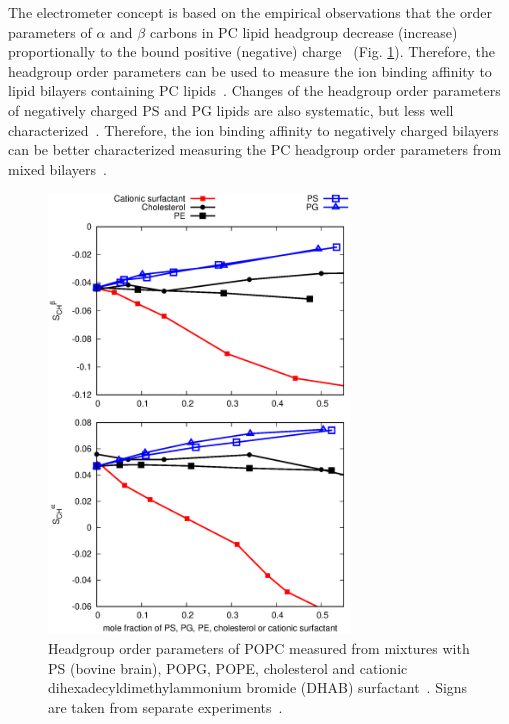 \documentclass[journal=jpcbfk]{achemso}
\begin{document}
The electrometer concept is based on the empirical observations that
the order parameters of $\alpha$ and $\beta$ carbons in PC lipid headgroup
decrease (increase) proportionally to the bound positive (negative) 
charge~\cite{akutsu81,altenbach84,seelig87,scherer89} (Fig. \ref{HGorderparametersPCvsPEPSPGchol}). 
Therefore, the headgroup order parameters can be used to measure the
ion binding affinity to lipid bilayers containing PC
lipids~\cite{akutsu81,altenbach84,borle85,seelig87,macdonald87,roux90}.
Changes of the headgroup order parameters of negatively charged PS and PG lipids
are also systematic, but less well characterized~\cite{borle85,macdonald87,roux86,roux90}.
Therefore, the ion binding affinity to negatively charged bilayers
can be better characterized measuring the PC headgroup order parameters from 
mixed bilayers~\cite{borle85,roux86,macdonald87,roux90,roux91}.
\begin{figure}[]
  \centering
  \includegraphics[width=8.0cm]{../Figs/HGorderparametersPCvsPEPSPGchol.eps}
  \caption{\label{HGorderparametersPCvsPEPSPGchol}
    Headgroup order parameters of POPC measured from mixtures with
    PS (bovine brain), POPG, POPE, cholesterol and cationic dihexadecyldimethylammonium bromide (DHAB) surfactant~\cite{scherer87,scherer89,ferreira13}.
    Signs are taken from separate experiments~\cite{ollila16,ferreira16}.
  }
\end{figure}
\end{document}
